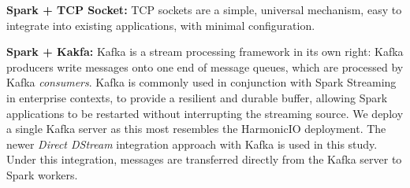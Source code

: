 \documentclass[letterpaper,conference]{IEEEtran}
\begin{document}

\textbf{Spark + TCP Socket:} TCP sockets are a simple, universal mechanism, easy to integrate into existing applications, with minimal configuration. 


\textbf{Spark + Kakfa:} Kafka is a stream processing framework in its own right: Kafka producers write messages onto one end of message queues, which are processed by Kafka \emph{consumers}. 
Kafka is commonly used in conjunction with Spark Streaming in enterprise contexts, to provide a resilient and durable buffer, allowing Spark applications to be restarted without interrupting the streaming source. We deploy a single Kafka server as this most resembles the HarmonicIO deployment. 
The newer \emph{Direct DStream} integration approach with Kafka is used in this study. Under this integration, messages are transferred directly from the Kafka server to Spark workers.
\end{document}
